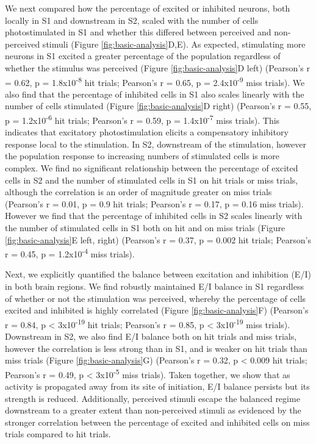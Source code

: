 We next compared how the percentage of excited or inhibited neurons, both locally in S1 and downstream in S2, scaled with the number of cells photostimulated in S1 and whether this differed between perceived and non-perceived stimuli (Figure \ref{fig:basic-analysis}D,E). As expected, stimulating more neurons in S1 excited a greater percentage of the population regardless of whether the stimulus was perceived (Figure \ref{fig:basic-analysis}D left)  (Pearson’s r = 0.62, p  = 1.8x10\textsuperscript{-8} hit trials; Pearson’s r = 0.65, p = 2.4x10\textsuperscript{-9} miss trials). We also find that the percentage of inhibited cells in S1 also scales linearly with the number of cells stimulated (Figure \ref{fig:basic-analysis}D right) (Pearson’s r = 0.55, p = 1.2x10\textsuperscript{-6} hit trials; Pearson’s r = 0.59, p = 1.4x10\textsuperscript{-7} miss trials). This indicates that excitatory photostimulation elicits a compensatory inhibitory response local to the stimulation. In S2, downstream of the stimulation, however the population response to increasing numbers of stimulated cells is more complex. We find no significant relationship between the percentage of excited cells in S2 and the number of stimulated cells in S1 on hit trials or miss trials, although the correlation is an order of magnitude greater on miss trials (Pearson’s r = 0.01, p = 0.9 hit trials; Pearson’s r = 0.17, p = 0.16 miss trials). However we find that the percentage of inhibited cells in S2 scales linearly with the number of stimulated cells in S1 both on hit and on miss trials (Figure \ref{fig:basic-analysis}E left, right) (Pearson’s r = 0.37, p = 0.002 hit trials; Pearson’s r = 0.45, p = 1.2x10\textsuperscript{-4} miss trials).

Next, we explicitly quantified the balance between excitation and inhibition (E/I) in both brain regions. We find robustly maintained E/I balance in S1 regardless of whether or not the stimulation was perceived, whereby the percentage of cells excited and inhibited is highly correlated (Figure \ref{fig:basic-analysis}F) (Pearson’s r = 0.84, p < 3x10\textsuperscript{-19} hit trials; Pearson’s r = 0.85, p < 3x10\textsuperscript{-19} miss trials). Downstream in S2, we also find E/I balance both on hit trials and miss trials, however the correlation is less strong than in S1, and is weaker on hit trials than miss trials (Figure \ref{fig:basic-analysis}G) (Pearson’s r = 0.32, p < 0.009 hit trials; Pearson’s r = 0.49, p < 3x10\textsuperscript{-5} miss trials). Taken together, we show that as activity is propagated away from its site of initiation, E/I balance persists but its strength is reduced. Additionally, perceived stimuli escape the balanced regime downstream to a greater extent than non-perceived stimuli as evidenced by the stronger correlation between the percentage of excited and inhibited cells on miss trials compared to hit trials. 


